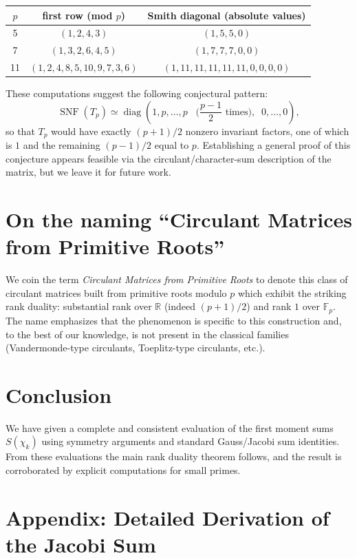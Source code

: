 \documentclass[11pt,a4paper]{article}
\theoremstyle{plain}
\theoremstyle{definition}
\begin{document}
\begin{center}
\begin{table}[H]
\centering
\begin{tabular}{c|c|c}
$p$ & first row (mod $p$) & Smith diagonal (absolute values) \\
\hline
5  & $(1,2,4,3)$ & $(1,5,5,0)$ \\
7  & $(1,3,2,6,4,5)$ & $(1,7,7,7,0,0)$ \\
11 & $(1,2,4,8,5,10,9,7,3,6)$ & $(1,11,11,11,11,11,0,0,0,0)$
\end{tabular}
\end{table}
\end{center}

These computations suggest the following conjectural pattern:
\[
\operatorname{SNF}(T_p) \simeq \operatorname{diag}\!\left(
1, p, \ldots, p \;\;\; \text{($\frac{p-1}{2}$ times)}, \;\; 0, \ldots, 0
\right),
\]
so that $T_p$ would have exactly $(p+1)/2$ nonzero invariant factors, one of which is $1$ and the remaining $(p-1)/2$ equal to $p$. Establishing a general proof of this conjecture appears feasible via the circulant/character-sum description of the matrix, but we leave it for future work.

\section{On the naming ``Circulant Matrices from Primitive Roots''}
We coin the term \emph{Circulant Matrices from Primitive Roots} to denote this class of circulant matrices built from primitive roots modulo $p$ which exhibit the striking rank duality: substantial rank over $\mathbb{R}$ (indeed $(p+1)/2$) and rank $1$ over $\mathbb{F}_p$. The name emphasizes that the phenomenon is specific to this construction and, to the best of our knowledge, is not present in the classical families (Vandermonde-type circulants, Toeplitz-type circulants, etc.).

\section{Conclusion}
We have given a complete and consistent evaluation of the first moment sums $S(\chi_k)$ using symmetry arguments and standard Gauss/Jacobi sum identities. From these evaluations the main rank duality theorem follows, and the result is corroborated by explicit computations for small primes.

\section*{Appendix: Detailed Derivation of the Jacobi Sum}
\label{sec:appendix}
\end{document}
